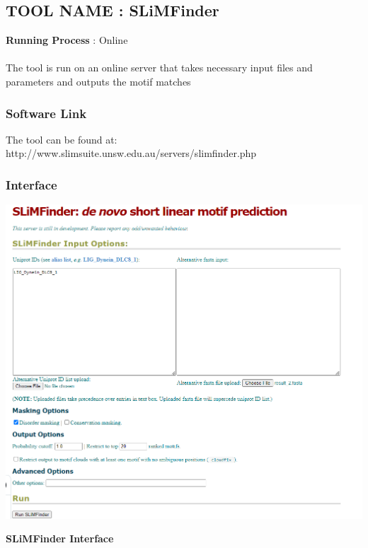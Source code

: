 \subsection{TOOL NAME : SLiMFinder}
\vspace{8pt}
\textbf{Running Process} : Online \\ \\
The tool is run on an online server that takes necessary input files and parameters and outputs the motif matches


\subsubsection{Software Link}
The tool can be found at: http://www.slimsuite.unsw.edu.au/servers/slimfinder.php

\vspace{8pt}

\subsubsection{Interface}
\begin{center}
\includegraphics[width=14cm]{images/interface2.png}
\end{center}
\begin{center}
\textbf{SLiMFinder Interface}
\end{center}

\vspace{8pt}

